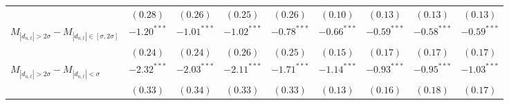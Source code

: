 \begin{tabular}{lcccccccc}
   & $(0.28)$ & $(0.26)$ & $(0.25)$ & $(0.26)$ & $(0.10)$ & $(0.13)$ & $(0.13)$ & $(0.13)$ \\ 
  $M_{|d_{n,t}| > 2 \sigma}-M_{|d_{n,t}| \in [\sigma, 2\sigma]}$ & $-1.20^{***}$ & $-1.01^{***}$ & $-1.02^{***}$ & $-0.78^{***}$ & $-0.66^{***}$ & $-0.59^{***}$ & $-0.58^{***}$ & $-0.59^{***}$ \\ 
   & $(0.24)$ & $(0.24)$ & $(0.26)$ & $(0.25)$ & $(0.15)$ & $(0.17)$ & $(0.17)$ & $(0.17)$ \\ 
  $M_{|d_{n,t}| > 2 \sigma}-M_{|d_{n,t}| < \sigma}$ & $-2.32^{***}$ & $-2.03^{***}$ & $-2.11^{***}$ & $-1.71^{***}$ & $-1.14^{***}$ & $-0.93^{***}$ & $-0.95^{***}$ & $-1.03^{***}$ \\ 
   & $(0.33)$ & $(0.34)$ & $(0.33)$ & $(0.33)$ & $(0.13)$ & $(0.16)$ & $(0.18)$ & $(0.17)$ \\ 
   \hline 
\end{tabular}

